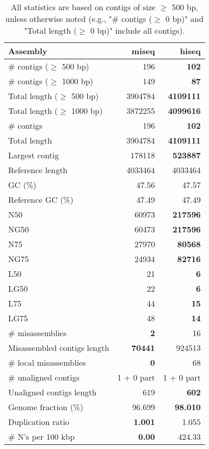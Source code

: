 \documentclass[12pt,a4paper]{article}
\begin{document}
\begin{table}[ht]
\begin{center}
\caption{All statistics are based on contigs of size $\geq$ 500 bp, unless otherwise noted (e.g., "\# contigs ($\geq$ 0 bp)" and "Total length ($\geq$ 0 bp)" include all contigs).}
\begin{tabular}{|l*{2}{|r}|}
\hline
Assembly & miseq & hiseq \\ \hline
\# contigs ($\geq$ 500 bp) & 196 & {\bf 102} \\ \hline
\# contigs ($\geq$ 1000 bp) & 149 & {\bf 87} \\ \hline
Total length ($\geq$ 500 bp) & 3904784 & {\bf 4109111} \\ \hline
Total length ($\geq$ 1000 bp) & 3872255 & {\bf 4099616} \\ \hline
\# contigs & 196 & {\bf 102} \\ \hline
Total length & 3904784 & {\bf 4109111} \\ \hline
Largest contig & 178118 & {\bf 523887} \\ \hline
Reference length & 4033464 & 4033464 \\ \hline
GC (\%) & 47.56 & 47.57 \\ \hline
Reference GC (\%) & 47.49 & 47.49 \\ \hline
N50 & 60973 & {\bf 217596} \\ \hline
NG50 & 60473 & {\bf 217596} \\ \hline
N75 & 27970 & {\bf 80568} \\ \hline
NG75 & 24934 & {\bf 82716} \\ \hline
L50 & 21 & {\bf 6} \\ \hline
LG50 & 22 & {\bf 6} \\ \hline
L75 & 44 & {\bf 15} \\ \hline
LG75 & 48 & {\bf 14} \\ \hline
\# misassemblies & {\bf 2} & 16 \\ \hline
Misassembled contigs length & {\bf 70441} & 924513 \\ \hline
\# local misassemblies & {\bf 0} & 68 \\ \hline
\# unaligned contigs & 1 + 0 part & 1 + 0 part \\ \hline
Unaligned contigs length & 619 & {\bf 602} \\ \hline
Genome fraction (\%) & 96.699 & {\bf 98.010} \\ \hline
Duplication ratio & {\bf 1.001} & 1.055 \\ \hline
\# N's per 100 kbp & {\bf 0.00} & 424.33 \\ \hline

\end{tabular}
\end{center}
\end{table}
\end{document}
